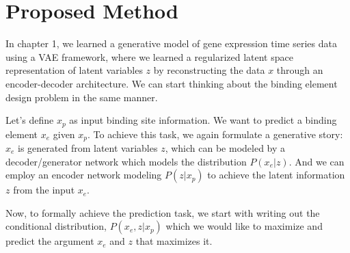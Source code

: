 \section{Proposed Method} 
In chapter 1, we learned a generative model of gene expression time
series data using a VAE framework, where we learned a regularized latent space representation of latent
variables $z$ by reconstructing the data $x$ through an encoder-decoder architecture. We can start
thinking about the binding element design problem in the same manner.

Let's define $x_p$ as input binding site information. We want to predict a binding element $x_e$
given $x_p$. To achieve this task, we again formulate a generative story: $x_e$ is generated from
latent variables $z$, which can be modeled by a decoder/generator network which models the
distribution $P(x_e|z)$. And we can employ an encoder network modeling $P(z|x_p)$ to achieve the
latent information $z$ from the input $x_e$.

Now, to formally achieve the prediction task, we start with writing out the conditional distribution,
$P(x_e, z|x_p)$ which we would like to maximize and predict the argument $x_e$ and $z$ that maximizes it.

